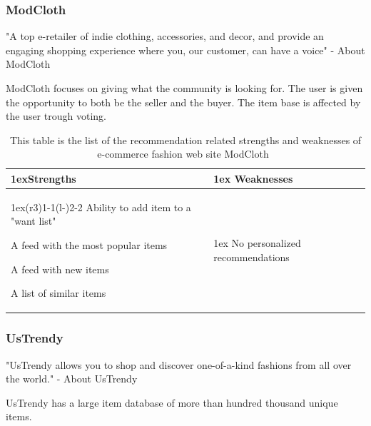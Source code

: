 \subsubsection{ModCloth} %
\label{par:modcloth}
    "A top e-retailer of indie clothing, accessories, and decor, and provide an engaging shopping experience where you, our customer, can have a voice" - About ModCloth~\cite{modcloth}

    ModCloth focuses on giving what the community is looking for.
    The user is given the opportunity to both be the seller and the buyer.
    The item base is affected by the user trough voting.
    \begin{table}[H]
            \centering
            \begin{tabularx}{\linewidth}{>{\parskip1ex}X@{\kern4\tabcolsep}>{\parskip1ex}X}
            	\toprule
            	\hfil\bfseries Strengths
            	&
            	\hfil\bfseries Weaknesses
            	\\\cmidrule(r{3\tabcolsep}){1-1}\cmidrule(l{-\tabcolsep}){2-2}
                Ability to add item to a "want list" \par
                A feed with the most popular items \par
                A feed with new items \par
                A list of similar items \par
            	&
                No personalized recommendations \par
            	\\ \bottomrule
        \end{tabularx}
        \caption[Recommendation related strengths and weaknesses of
        ModCloth~\cite{modcloth}]{This table is the list of the recommendation
        related strengths and weaknesses of e-commerce fashion web site
        ModCloth~\cite{modcloth}}
        \label{table:ecommenreceModCloth}
    \end{table}


\subsubsection{UsTrendy} %
\label{par:ustrendy}
    "UsTrendy allows you to shop and discover one-of-a-kind fashions from all over the world." - About UsTrendy~\cite{UsTrendy}

    UsTrendy has a large item database of more than hundred thousand unique items.

